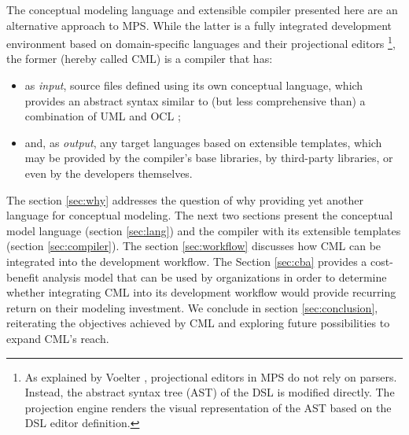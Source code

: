 The conceptual modeling language and extensible compiler presented here are an alternative approach to MPS.
While the latter is a fully integrated development environment based on domain-specific languages and their projectional editors \footnote{As explained by Voelter \cite{voelter}, projectional editors in MPS do not rely on parsers. Instead, the abstract syntax tree (AST) of the DSL is modified directly. The projection engine renders the visual representation of the AST based on the DSL editor definition.}, the former (hereby called CML) is a compiler that has:
\begin{itemize}
\item as \emph{input}, source files defined using its own conceptual language, which provides an abstract syntax similar to (but less comprehensive than) a combination of UML \cite{uml} and OCL \cite{ocl}; 
\item and, as \emph{output}, any target languages based on extensible templates, which may be provided by the compiler's base libraries, by third-party libraries, or even by the developers themselves.
\end{itemize}

The section \ref{sec:why} addresses the question of why providing yet another language for conceptual modeling. The next two sections present the conceptual model language (section \ref{sec:lang}) and the compiler with its extensible templates (section \ref{sec:compiler}). The section \ref{sec:workflow} discusses how CML can be integrated into the development workflow. The Section \ref{sec:cba} provides a cost-benefit analysis model that can be used by organizations in order to determine whether integrating CML into its development workflow would provide recurring return on their modeling investment. We conclude in section \ref{sec:conclusion}, reiterating the objectives achieved by CML and exploring future possibilities to expand CML's reach.
